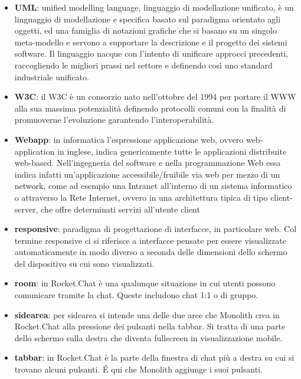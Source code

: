 \begin{itemize}
\item[] \textbf{UML}: unified modelling language, linguaggio di modellazione unificato, è un linguaggio di modellazione e specifica basato sul paradigma orientato agli oggetti, ed una famiglia di notazioni grafiche che si basano su un singolo meta-modello e servono a supportare la descrizione e il progetto dei sistemi software. Il linguaggio nacque con l'intento di unificare approcci precedenti, raccogliendo le migliori prassi nel settore e definendo così uno standard industriale unificato.
\end{itemize}
\newpage

\begin{itemize}
\item[] \textbf{W3C}: il W3C è un consorzio nato nell'ottobre del 1994 per portare il WWW alla sua massima potenzialità definendo protocolli comuni con la finalità di promuoverne l'evoluzione garantendo l'interoperabilità.
\item[] \textbf{Webapp}: in informatica l'espressione applicazione web, ovvero web-application in inglese, indica genericamente tutte le applicazioni distribuite web-based. Nell'ingegneria del software e nella programmazione Web essa indica infatti un'applicazione accessibile/fruibile via web per mezzo di un network, come ad esempio una Intranet all'interno di un sistema informatico o attraverso la Rete Internet, ovvero in una architettura tipica di tipo client-server, che offre determinati servizi all'utente client
\end{itemize}
\newpage

\begin{itemize}
\item[] \textbf{responsive}: paradigma di progettazione di interfacce, in particolare web. Col termine responsive ci si riferisce a interfacce pensate per essere visualizzate automaticamente in modo diverso a seconda delle dimensioni dello schermo del dispositivo su cui sono visualizzati.
\item[] \textbf{room}: in Rocket.Chat è una qualunque situazione in cui utenti possono comunicare tramite la chat. Queste includono chat 1:1 o di gruppo.
\end{itemize}
\newpage

\begin{itemize}
\item[] \textbf{sidearea}: per sidearea si intende una delle due aree che Monolith crea in Rocket.Chat alla pressione dei pulsanti nella tabbar. Si tratta di una parte dello schermo sulla destra che diventa fullscreen in visualizzazione mobile.
\end{itemize}
\newpage

\begin{itemize}
\item[] \textbf{tabbar}: in Rocket.Chat è la parte della finestra di chat più a destra su cui si trovano alcuni pulsanti. \'E qui che Monolith aggiunge i suoi pulsanti.
\end{itemize}
